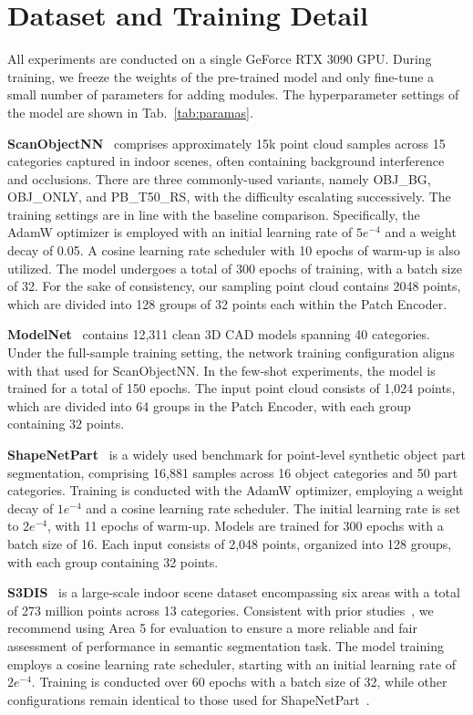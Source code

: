 \clearpage
\setcounter{page}{1}
\maketitlesupplementary
\appendix

\section{Dataset and Training Detail}

All experiments are conducted on a single GeForce RTX 3090 GPU. During training, we freeze the weights of the pre-trained model and only fine-tune a small number of parameters for adding modules. The hyperparameter settings of the model are shown in Tab.~\ref{tab:paramas}.

\textbf{ScanObjectNN}~\cite{uy2019revisiting} comprises approximately 15k point cloud samples across 15 categories captured in indoor scenes, often containing background interference and occlusions. There are three commonly-used variants, namely OBJ\_BG, OBJ\_ONLY, and PB\_T50\_RS, with the difficulty escalating successively. The training settings are in line with the baseline comparison. Specifically, the AdamW optimizer is employed with an initial learning rate of $5e^{-4}$ and a weight decay of 0.05. A cosine learning rate scheduler with 10 epochs of warm-up is also utilized. The model undergoes a total of 300 epochs of training, with a batch size of 32. For the sake of consistency, our sampling point cloud contains 2048 points, which are divided into 128 groups of 32 points each within the Patch Encoder.

\textbf{ModelNet}~\cite{wu20153d} contains 12,311 clean 3D CAD models spanning 40 categories. Under the full-sample training setting, the network training configuration aligns with that used for ScanObjectNN. In the few-shot experiments, the model is trained for a total of 150 epochs. The input point cloud consists of 1,024 points, which are divided into 64 groups in the Patch Encoder, with each group containing 32 points.

\textbf{ShapeNetPart}~\cite{yi2016scalable} is a widely used benchmark for point-level synthetic object part segmentation, comprising 16,881 samples across 16 object categories and 50 part categories. Training is conducted with the AdamW optimizer, employing a weight decay of $1e^{-4}$ and a cosine learning rate scheduler. The initial learning rate is set to $2e^{-4}$, with 11 epochs of warm-up. Models are trained for 300 epochs with a batch size of 16. Each input consists of 2,048 points, organized into 128 groups, with each group containing 32 points.

\textbf{S3DIS}~\cite{armeni20163d} is a large-scale indoor scene dataset encompassing six areas with a total of 273 million points across 13 categories. Consistent with prior studies~\cite{dong2022autoencoders}, we recommend using Area 5 for evaluation to ensure a more reliable and fair assessment of performance in semantic segmentation task. The model training employs a cosine learning rate scheduler, starting with an initial learning rate of $2e^{-4}$. Training is conducted over 60 epochs with a batch size of 32, while other configurations remain identical to those used for ShapeNetPart~\cite{yi2016scalable}.

